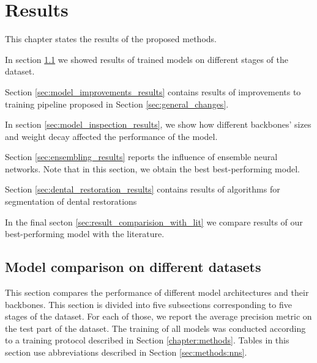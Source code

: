 \chapter{Results}
\label{chapter:results}
This chapter states the results of the proposed methods.

In section \ref{sec:model_comparison} we showed results of trained models on different stages of the dataset.

Section \ref{sec:model_improvements_results} contains results of improvements to training pipeline proposed in Section \ref{sec:general_changes}.

In section \ref{sec:model_inspection_results}, we show how different backbones' sizes and weight decay affected the performance of the model.

Section \ref{sec:ensembling_results} reports the influence of ensemble neural networks. Note that in this section, we obtain the best best-performing model.

Section \ref{sec:dental_restoration_results} contains results of algorithms for segmentation of dental restorations

In the final secton \ref{sec:result_comparision_with_lit} we compare results of our best-performing model with the literature.

\section{Model comparison on different datasets}
\label{sec:model_comparison}
This section compares the performance of different model architectures and their backbones. This section is divided into five subsections corresponding to five stages of the dataset. For each of those, we report the average precision metric on the test part of the dataset. The training of all models was conducted according to a training protocol described in Section \ref{chapter:methods}. Tables in this section use abbreviations described in Section \ref{sec:methods:nns}.

